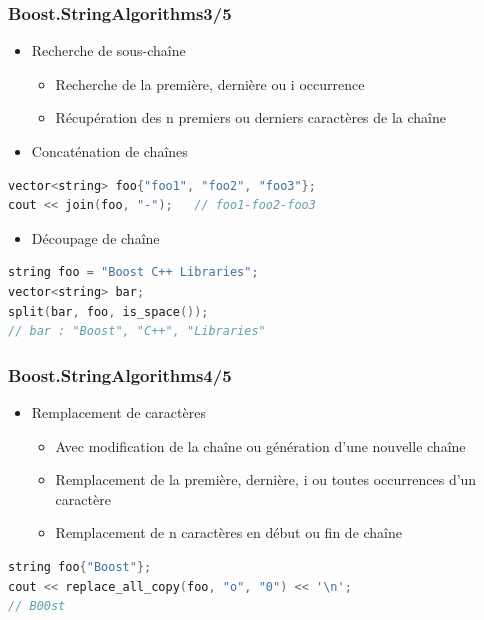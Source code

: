 \documentclass[C++.tex]{subfiles}
\begin{document}
\begin{frame}[fragile]
	\frametitle{Boost.StringAlgorithms\titlehfill{}3/5}
	\begin{itemize}
		\item Recherche de sous-chaîne
		\begin{itemize}
			\item Recherche de la première, dernière ou i\ieme{} occurrence
			\item Récupération des n premiers ou derniers caractères de la chaîne
		\end{itemize}
		\item Concaténation de chaînes
	\end{itemize}

	\begin{lstlisting}[language=C++]
vector<string> foo{"foo1", "foo2", "foo3"};
cout << join(foo, "-");   // foo1-foo2-foo3\end{lstlisting}

	\begin{itemize}
		\item Découpage de chaîne
	\end{itemize}

	\begin{lstlisting}[language=C++]
string foo = "Boost C++ Libraries";
vector<string> bar;
split(bar, foo, is_space());
// bar : "Boost", "C++", "Libraries"\end{lstlisting}
\end{frame}

\begin{frame}[fragile]
	\frametitle{Boost.StringAlgorithms\titlehfill{}4/5}
	\begin{itemize}
		\item Remplacement de caractères
		\begin{itemize}
			\item Avec modification de la chaîne ou génération d'une nouvelle chaîne
			\item Remplacement de la première, dernière, i\ieme{} ou toutes occurrences d'un caractère
			\item Remplacement de n caractères en début ou fin de chaîne
		\end{itemize}
	\end{itemize}

	\begin{lstlisting}[language=C++]
string foo{"Boost"};
cout << replace_all_copy(foo, "o", "0") << '\n';
// B00st\end{lstlisting}
\end{frame}
\end{document}
